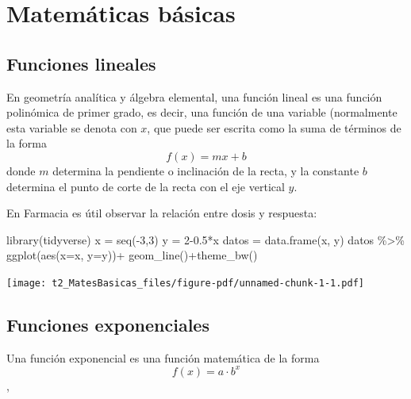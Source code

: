 \documentclass[
  letterpaper,
  DIV=11,
  numbers=noendperiod]{scrreprt}
\newenvironment{Shaded}{\begin{snugshade}}{\end{snugshade}}
\newcommand{\AttributeTok}[1]{\textcolor[rgb]{0.40,0.45,0.13}{#1}}
\newcommand{\DecValTok}[1]{\textcolor[rgb]{0.68,0.00,0.00}{#1}}
\newcommand{\FloatTok}[1]{\textcolor[rgb]{0.68,0.00,0.00}{#1}}
\newcommand{\FunctionTok}[1]{\textcolor[rgb]{0.28,0.35,0.67}{#1}}
\newcommand{\NormalTok}[1]{\textcolor[rgb]{0.00,0.23,0.31}{#1}}
\newcommand{\OtherTok}[1]{\textcolor[rgb]{0.00,0.23,0.31}{#1}}
\newcommand{\SpecialCharTok}[1]{\textcolor[rgb]{0.37,0.37,0.37}{#1}}
\begin{document}
\section{Matemáticas básicas}\label{matemuxe1ticas-buxe1sicas-1}

\subsection{Funciones lineales}\label{funciones-lineales}

En geometría analítica y álgebra elemental, una función lineal es una
función polinómica de primer grado, es decir, una función de una
variable (normalmente esta variable se denota con \(x\), que puede ser
escrita como la suma de términos de la forma \[f(x)=mx+b\] donde \(m\)
determina la pendiente o inclinación de la recta, y la constante \(b\)
determina el punto de corte de la recta con el eje vertical \(y\).

En Farmacia es útil observar la relación entre dosis y respuesta:

\begin{Shaded}
\begin{Highlighting}[]
\FunctionTok{library}\NormalTok{(tidyverse)}
\NormalTok{x }\OtherTok{=} \FunctionTok{seq}\NormalTok{(}\SpecialCharTok{{-}}\DecValTok{3}\NormalTok{,}\DecValTok{3}\NormalTok{)}
\NormalTok{y }\OtherTok{=} \DecValTok{2}\FloatTok{{-}0.5}\SpecialCharTok{*}\NormalTok{x}
\NormalTok{datos }\OtherTok{=} \FunctionTok{data.frame}\NormalTok{(x, y)}
\NormalTok{datos }\SpecialCharTok{\%\textgreater{}\%} \FunctionTok{ggplot}\NormalTok{(}\FunctionTok{aes}\NormalTok{(}\AttributeTok{x=}\NormalTok{x, }\AttributeTok{y=}\NormalTok{y))}\SpecialCharTok{+}
  \FunctionTok{geom\_line}\NormalTok{()}\SpecialCharTok{+}\FunctionTok{theme\_bw}\NormalTok{()}
\end{Highlighting}
\end{Shaded}

\begin{center}
\texttt{[image: t2\_MatesBasicas\_files/figure-pdf/unnamed-chunk-1-1.pdf]}
\end{center}

\subsection{Funciones exponenciales}\label{funciones-exponenciales}

Una función exponencial es una función matemática de la forma
\[f(x) = a \cdot b^x\],
\end{document}
